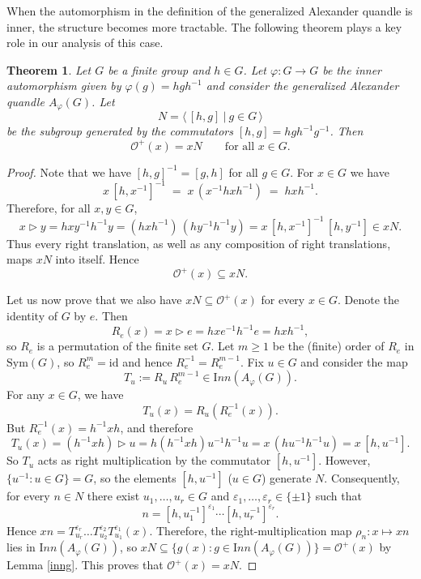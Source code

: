 \documentclass[english,11pt]{amsart}
\newtheorem{Theorem}{Theorem}[section]
\newcommand{\Inn}{{\mathrm Inn}}
\begin{document}
When the automorphism in the definition of the generalized Alexander quandle is inner, the structure becomes more tractable. The following theorem plays a key role in our analysis of this case.

\begin{Theorem}
\label{orbits}
Let $G$ be a finite group and $h\in G$. Let $\varphi:G\to G$ be the inner automorphism given by
$\varphi(g)=hgh^{-1}$ and consider the generalized Alexander quandle $A_\varphi(G)$.
Let
\[
N=\Big\langle\,[h,g]\ \Big|\ g\in G\,\Big\rangle
\]
be the subgroup generated by the commutators
$[h,g]=hgh^{-1}g^{-1}$.
Then 
\[
\mathcal O^{+}(x)=xN \qquad \text{for all } x\in G.
\]
\end{Theorem}

\begin{proof}
Note that we have $[h,g]^{-1}=[g,h]$ for all $g\in G$.
For $x\in G$ we have
\[
x\,[h,x^{-1}]^{-1} \;=\; x\,(x^{-1}hx h^{-1}) \;=\; hxh^{-1}.
\]
Therefore, for all $x,y\in G$,
\[
x\rhd y
= hxy^{-1}h^{-1}y
= (hxh^{-1})\,(hy^{-1}h^{-1}y)
= x\,[h,x^{-1}]^{-1}\,[h,y^{-1}] \in xN.
\]
Thus every right translation, as well as any composition of right translations, maps $xN$ into itself.  Hence
\[
\mathcal O^{+}(x) \subseteq xN.
\]

Let us now prove that we also have  $xN \subseteq \mathcal O^{+}(x)$ for every $x \in G$.
Denote the identity of $G$ by $e$. Then
\[
R_e(x)=x\rhd e=hxe^{-1}h^{-1}e=hxh^{-1},
\]
so $R_e$ is a permutation of the finite set $G$. Let $m\ge 1$ be the (finite) order of $R_e$ in
$\mathrm{Sym}(G)$, so $R_e^m=\mathrm{id}$ and hence $R_e^{-1}=R_e^{m-1}$.
Fix $u\in G$ and consider the map
\[
T_u := R_u\,R_e^{m-1} \in \Inn(A_\varphi(G)).
\]
For any $x\in G$, we have
\[
T_u(x)=R_u(R_e^{-1}(x)).
\]
But $R_e^{-1}(x)=h^{-1}xh$, and therefore
\[
T_u(x)
= (h^{-1}xh)\rhd u
= h(h^{-1}xh)u^{-1}h^{-1}u
= x\,(hu^{-1}h^{-1}u)
= x\,[h,u^{-1}].
\]
So $T_u$ acts as right multiplication by the commutator $[h,u^{-1}]$.
However, $\{u^{-1} : u\in G\}=G$, so the elements $[h,u^{-1}]$
($u\in G$) generate $N$. Consequently, for every $n\in N$ there exist $u_1,\dots,u_r\in G$ and
$\varepsilon_1,\dots,\varepsilon_r\in\{\pm1\}$ such that
\[
n=[h,u_1^{-1}]^{\varepsilon_1}\cdots [h,u_r^{-1}]^{\varepsilon_r}.
\]
Hence $xn=T_{u_r}^{\varepsilon_r}\ldots T_{u_2}^{\varepsilon_2}T_{u_1}^{\varepsilon_1}(x)$. 
Therefore, the right-multiplication map $\rho_n:x\mapsto xn$ lies in $\Inn(A_{\varphi}(G))$, so
$xN \subseteq \{g(x) : g \in \Inn(A_{\varphi}(G))\}=\mathcal O^+(x)$ by Lemma \ref{inng}.
This proves that $\mathcal O^{+}(x)=xN$.
\end{proof}
\end{document}
